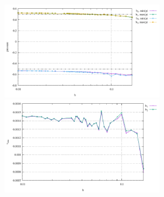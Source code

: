 \begin{center}
\includegraphics[width=7cm]{python_codes/fieldstone_72/results/sphere/pstats}
\includegraphics[width=7cm]{python_codes/fieldstone_72/results/sphere/vrms}
\end{center}


